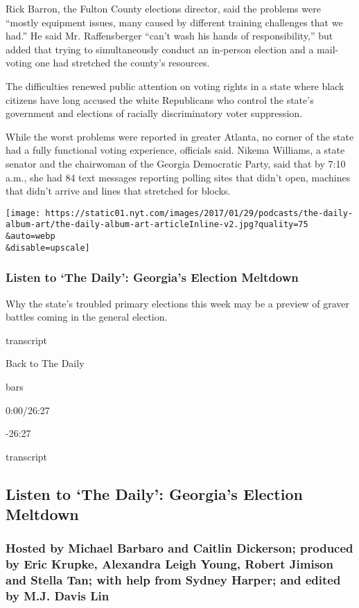 Rick Barron, the Fulton County elections director, said the problems
were ``mostly equipment issues, many caused by different training
challenges that we had.'' He said Mr. Raffensberger ``can't wash his
hands of responsibility,'' but added that trying to simultaneously
conduct an in-person election and a mail-voting one had stretched the
county's resources.

The difficulties renewed public attention on voting rights in a state
where black citizens have long accused the white Republicans who control
the state's government and elections of racially discriminatory voter
suppression.

While the worst problems were reported in greater Atlanta, no corner of
the state had a fully functional voting experience, officials said.
Nikema Williams, a state senator and the chairwoman of the Georgia
Democratic Party, said that by 7:10 a.m., she had 84 text messages
reporting polling sites that didn't open, machines that didn't arrive
and lines that stretched for blocks.

\texttt{[image: https://static01.nyt.com/images/2017/01/29/podcasts/the-daily-album-art/the-daily-album-art-articleInline-v2.jpg?quality=75\\\&auto=webp\\\&disable=upscale]}

\hypertarget{listen-to-the-daily-georgias-election-meltdown}{%
\subsubsection{Listen to `The Daily': Georgia's Election
Meltdown}\label{listen-to-the-daily-georgias-election-meltdown}}

Why the state's troubled primary elections this week may be a preview of
graver battles coming in the general election.

transcript

Back to The Daily

bars

0:00/26:27

-26:27

transcript

\hypertarget{listen-to-the-daily-georgias-election-meltdown-1}{%
\subsection{Listen to `The Daily': Georgia's Election
Meltdown}\label{listen-to-the-daily-georgias-election-meltdown-1}}

\hypertarget{hosted-by-michael-barbaro-and-caitlin-dickerson-produced-by-eric-krupke-alexandra-leigh-young-robert-jimison-and-stella-tan-with-help-from-sydney-harper-and-edited-by-mj-davis-lin}{%
\subsubsection{Hosted by Michael Barbaro and Caitlin Dickerson; produced
by Eric Krupke, Alexandra Leigh Young, Robert Jimison and Stella Tan;
with help from Sydney Harper; and edited by M.J. Davis
Lin}\label{hosted-by-michael-barbaro-and-caitlin-dickerson-produced-by-eric-krupke-alexandra-leigh-young-robert-jimison-and-stella-tan-with-help-from-sydney-harper-and-edited-by-mj-davis-lin}}

